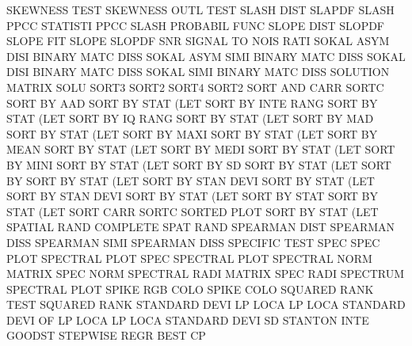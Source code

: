 SKEWNESS TEST                           SKEWNESS OUTL TEST
SLASH    DIST                           SLAPDF
SLASH    PPCC                           STATISTI PPCC
SLASH                                   PROBABIL FUNC
SLOPE    DIST                           SLOPDF
SLOPE                                   FIT
SLOPE                                   SLOPDF
SNR                                     SIGNAL   TO   NOIS RATI
SOKAL    ASYM DISI                      BINARY   MATC DISS
SOKAL    ASYM SIMI                      BINARY   MATC DISS
SOKAL    DISI                           BINARY   MATC DISS
SOKAL    SIMI                           BINARY   MATC DISS
SOLUTION                                MATRIX   SOLU
SORT3                                   SORT2
SORT4                                   SORT2
SORT     AND  CARR                      SORTC
SORT     BY   AAD                       SORT     BY   STAT (LET
SORT     BY   INTE RANG                 SORT     BY   STAT (LET
SORT     BY   IQ   RANG                 SORT     BY   STAT (LET
SORT     BY   MAD                       SORT     BY   STAT (LET
SORT     BY   MAXI                      SORT     BY   STAT (LET
SORT     BY   MEAN                      SORT     BY   STAT (LET
SORT     BY   MEDI                      SORT     BY   STAT (LET
SORT     BY   MINI                      SORT     BY   STAT (LET
SORT     BY   SD                        SORT     BY   STAT (LET
SORT     BY                             SORT     BY   STAT (LET
SORT     BY   STAN DEVI                 SORT     BY   STAT (LET
SORT     BY   STAN DEVI                 SORT     BY   STAT (LET
SORT     BY   STAT                      SORT     BY   STAT (LET
SORT     CARR                           SORTC
SORTED   PLOT                           SORT     BY   STAT (LET
SPATIAL  RAND                           COMPLETE SPAT RAND
SPEARMAN DIST                           SPEARMAN DISS
SPEARMAN SIMI                           SPEARMAN DISS
SPECIFIC                                TEST     SPEC
SPEC     PLOT                           SPECTRAL PLOT
SPEC                                    SPECTRAL PLOT
SPECTRAL NORM                           MATRIX   SPEC NORM
SPECTRAL RADI                           MATRIX   SPEC RADI
SPECTRUM                                SPECTRAL PLOT
SPIKE    RGB  COLO                      SPIKE    COLO
SQUARED  RANK TEST                      SQUARED  RANK
STANDARD DEVI LP   LOCA                 LP       LOCA
STANDARD DEVI OF   LP   LOCA            LP       LOCA
STANDARD DEVI                           SD
STANTON  INTE                           GOODST
STEPWISE REGR                           BEST     CP
